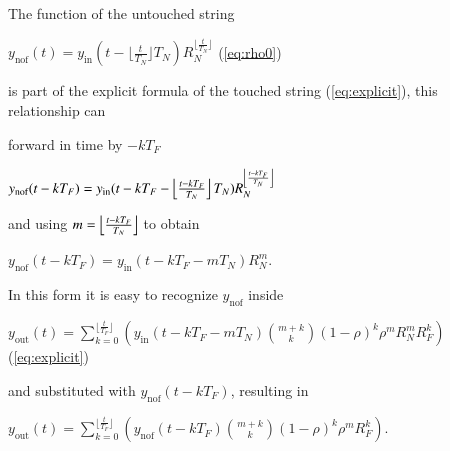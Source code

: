 The function of the untouched string

$y_{\textrm{nof}}(t) = y_{\textrm{in}}(t-\lfloor\frac{t}{T_N}\rfloor T_N)R_N^{\lfloor\frac{t}{T_N}\rfloor}$
(\ref{eq:rho0})

is part of the explicit formula of the touched string (\ref{eq:explicit}),
this relationship can 

forward in time by $-kT_F$

$y_{\textrm{nof}}(t-kT_F) = y_{\textrm{in}}(t-kT_F-\left\lfloor \frac{t - kT_F}{T_N} \right\rfloor T_N)R_N^{\left\lfloor \frac{t - kT_F}{T_N} \right\rfloor}$

and using $m=\left\lfloor \frac{t - kT_F}{T_N} \right\rfloor$ to obtain

$y_{\textrm{nof}}(t-kT_F) = y_{\textrm{in}}(t-kT_F-m T_N)R_N^{m}$.

In this form it is easy to recognize $y_{\textrm{nof}}$ inside

$y_{\textrm{out}}(t) = \sum_{k=0}^{\lfloor \frac{t}{T_F} \rfloor}\left(y_{\textrm{in}}(t - kT_F - mT_N)\binom{m+k}{k} (1 - \rho)^{k} \rho^mR_N^mR_F^k\right)$
(\ref{eq:explicit})

and substituted with $y_{\textrm{nof}}(t-kT_F)$, resulting in

$y_{\textrm{out}}(t) = \sum_{k=0}^{\lfloor \frac{t}{T_F} \rfloor}\left(y_{\textrm{nof}}(t - kT_F)\binom{m+k}{k} (1 - \rho)^{k} \rho^mR_F^k\right)$.
